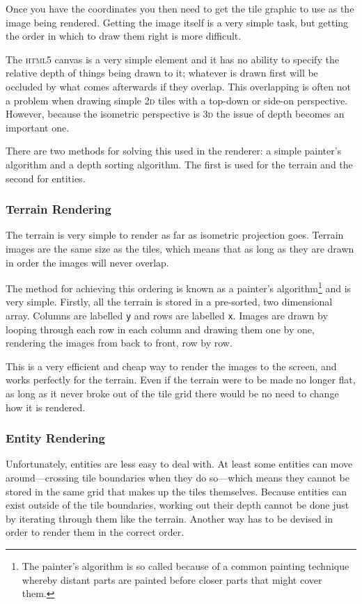 Once you have the coordinates you then need to get the tile graphic to use as the image being rendered. Getting the image itself is a very simple task, but getting the order in which to draw them right is more difficult.

The \textsc{html5} canvas is a very simple element and it has no ability to specify the relative depth of things being drawn to it; whatever is drawn first will be occluded by what comes afterwards if they overlap. This overlapping is often not a problem when drawing simple \textsc{2d} tiles with a top-down or side-on perspective. However, because the isometric perspective is \textsc{3d} the issue of depth becomes an important one.


There are two methods for solving this used in the renderer: a simple painter's algorithm and a depth sorting algorithm. The first is used for the terrain and the second for entities.

\subsubsection{Terrain Rendering}
The terrain is very simple to render as far as isometric projection goes. Terrain images are the same size as the tiles, which means that as long as they are drawn in order the images will never overlap.

The method for achieving this ordering is known as a painter's algorithm\footnote{The painter's algorithm is so called because of a common painting technique whereby distant parts are painted before closer parts that might cover them.} and is very simple. Firstly, all the terrain is stored in a pre-sorted, two dimensional array. Columns are labelled \texttt{y} and rows are labelled \texttt{x}. Images are drawn by looping through each row in each column and drawing them one by one, rendering the images from back to front, row by row.


This is a very efficient and cheap way to render the images to the screen, and works perfectly for the terrain. Even if the terrain were to be made no longer flat, as long as it never broke out of the tile grid there would be no need to change how it is rendered.

\subsubsection{Entity Rendering}\label{entity_rendering}
Unfortunately, entities are less easy to deal with. At least some entities can move around---crossing tile boundaries when they do so---which means they cannot be stored in the same grid that makes up the tiles themselves. Because entities can exist outside of the tile boundaries, working out their depth cannot be done just by iterating through them like the terrain. Another way has to be devised in order to render them in the correct order.

